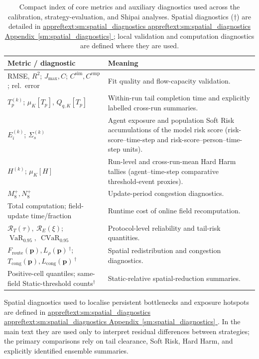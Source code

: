 \documentclass[preprint,12pt]{elsarticle}
\DeclareRobustCommand{\appref}[1]{%
  \hyperref[#1]{%
    \ifcsname appreftext:#1\endcsname%
      \csname appreftext:#1\endcsname%
    \else%
      Appendix~\ref*{#1}%
    \fi%
  }%
}
\begin{document}
\begin{table}[htbp]
\centering
\small
\setlength{\tabcolsep}{6pt}
\renewcommand{\arraystretch}{1.08}
\caption{Compact index of core metrics and auxiliary diagnostics used
across the calibration, strategy-evaluation, and Shipai analyses.
Spatial diagnostics ($\dagger$) are detailed in
\appref{sm:spatial_diagnostics}; local validation and computation
diagnostics are defined where they are used.}
\label{tab:metric_summary}
\begin{tabularx}{\textwidth}{@{}
  >{\raggedright\arraybackslash}p{}
  >{\raggedright\arraybackslash}X@{}}
\toprule
\textbf{Metric / diagnostic} & \textbf{Meaning} \\
\midrule
RMSE, $R^{2}$; $J_{\max}, C$; $C^{\mathrm{sim}}, C^{\mathrm{emp}}$; rel.\ error
  & Fit quality and flow-capacity validation. \\
$T_p^{(k)}$; $\mu_K[T_p]$, $Q_{q,K}[T_p]$
  & Within-run tail completion time and explicitly labelled cross-run summaries. \\
$E_i^{(k)}$; $\Sigma_s^{(k)}$
  & Agent exposure and population Soft Risk accumulations of the model risk score
    (risk-score--time-step and risk-score--person--time-step units). \\
$H^{(k)}$; $\mu_K[H]$
  & Run-level and cross-run-mean Hard Harm tallies
    (agent--time-step comparative threshold-event proxies). \\
$M^{+}_{8}, N^{+}_{8}$
  & Update-period congestion diagnostics. \\
Total computation; field-update time/fraction
  & Runtime cost of online field recomputation. \\
$\mathcal{R}_T(\tau),\ \mathcal{R}_E(\xi)$;
$\operatorname{VaR}_{0.95},\ \operatorname{CVaR}_{0.95}$
  & Protocol-level reliability and tail-risk quantities. \\
$F_{\mathrm{route}}(\mathbf{p}), L_{\rho}(\mathbf{p})$\,$^\dagger$;
$T_{\mathrm{cong}}(\mathbf{p}), L_{\mathrm{cong}}(\mathbf{p})$\,$^\dagger$
  & Spatial redistribution and congestion diagnostics. \\
Positive-cell quantiles; same-field Static-threshold counts$^\dagger$
  & Static-relative spatial-reduction summaries. \\
\bottomrule
\end{tabularx}
\end{table}

Spatial diagnostics used to localise persistent bottlenecks and
exposure hotspots are defined in \appref{sm:spatial_diagnostics}. In the
main text they are used only to interpret residual differences between
strategies; the primary comparisons rely on tail clearance, Soft Risk,
Hard Harm, and explicitly identified ensemble summaries.
\end{document}
